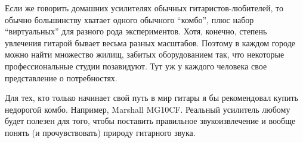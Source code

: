 Если же говорить домашних усилителях обычных гитаристов-любителей, то обычно большинству хватает одного обычного “комбо”, плюс набор “виртуальных” для разного рода экспериментов. Хотя, конечно, степень увлечения гитарой бывает весьма разных масштабов. Поэтому в каждом городе можно найти множество жилищ, забитых оборудованием так, что некоторые профессиональные студии позавидуют. Тут уж у каждого человека свое представление о потребностях.

Для тех, кто только начинает свой путь в мир гитары я бы рекомендовал купить недорогой комбо. Например, Marshall MG10CF. Реальный усилитель любому будет полезен для того, чтобы поставить правильное звукоизвлечение и вообще понять (и прочувствовать) природу гитарного звука.
